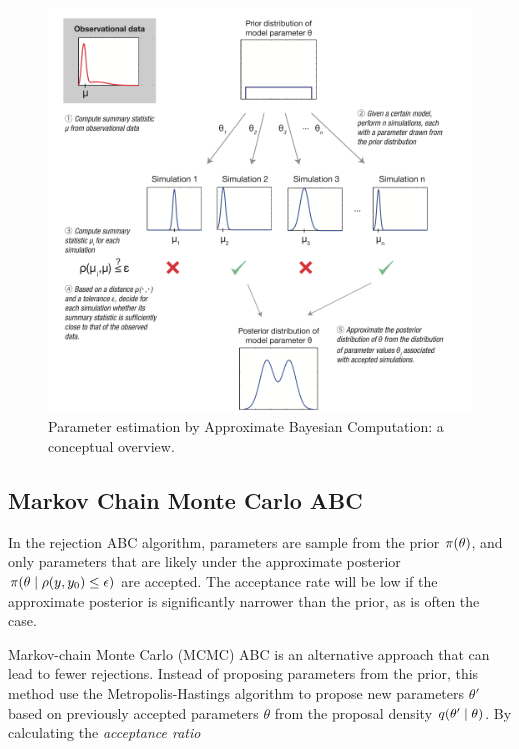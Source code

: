 \begin{figure}[H]
    \centering 
    \includegraphics[scale=0.7]{./3_Images/abc_pipeline.png}
    \caption{Parameter estimation by Approximate Bayesian Computation: a conceptual overview.}
    \label{fig:abc_pipeline}
\end{figure}


\subsection{Markov Chain Monte Carlo ABC}\label{sec:mcmc_abc}

In the rejection ABC algorithm, parameters are sample from the prior $\pi \qty(\theta)$, and only parameters that are likely under the approximate posterior $\pi \qty(\theta \mid \rho \qty(y, y_0 ) \leq \epsilon )$ are accepted. The acceptance rate will be low if the approximate posterior is significantly narrower than the prior, as is often the case. %

Markov-chain Monte Carlo (MCMC) ABC is an alternative approach that can lead to fewer rejections. Instead of proposing parameters from the prior, this method use the Metropolis-Hastings algorithm to propose new parameters $\theta'$ based on previously accepted parameters $\theta$ from the proposal density $q \qty(\theta' \mid \theta)$. By calculating the \textit{acceptance ratio}

